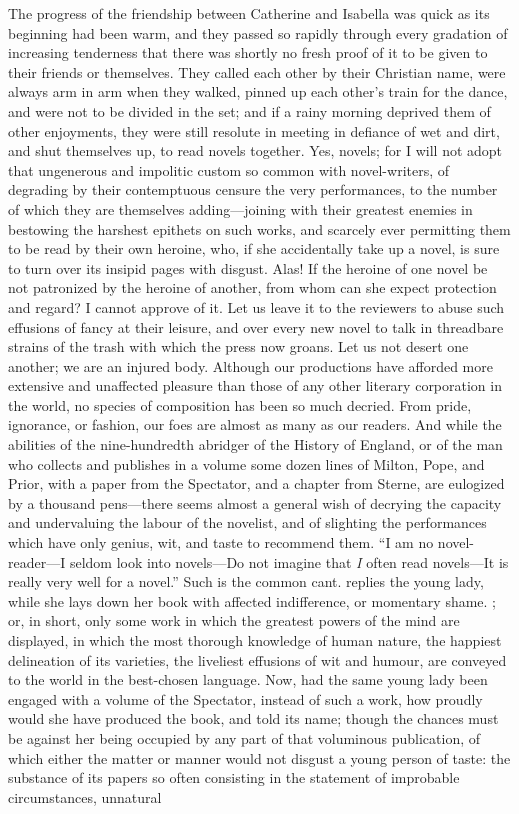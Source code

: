 The progress of the friendship between Catherine and Isabella was quick as its beginning had been warm, and they passed so rapidly through every gradation of increasing tenderness that there was shortly no fresh proof of it to be given to their friends or themselves. They called each other by their Christian name, were always arm in arm when they walked, pinned up each other's train for the dance, and were not to be divided in the set; and if a rainy morning deprived them of other enjoyments, they were still resolute in meeting in defiance of wet and dirt, and shut themselves up, to read novels together. Yes, novels; for I will not adopt that ungenerous and impolitic custom so common with novel-writers, of degrading by their contemptuous censure the very performances, to the number of which they are themselves adding---joining with their greatest enemies in bestowing the harshest epithets on such works, and scarcely ever permitting them to be read by their own heroine, who, if she accidentally take up a novel, is sure to turn over its insipid pages with disgust. Alas! If the heroine of one novel be not patronized by the heroine of another, from whom can she expect protection and regard? I cannot approve of it. Let us leave it to the reviewers to abuse such effusions of fancy at their leisure, and over every new novel to talk in threadbare strains of the trash with which the press now groans. Let us not desert one another; we are an injured body. Although our productions have afforded more extensive and unaffected pleasure than those of any other literary corporation in the world, no species of composition has been so much decried. From pride, ignorance, or fashion, our foes are almost as many as our readers. And while the abilities of the nine-hundredth abridger of the History of England, or of the man who collects and publishes in a volume some dozen lines of Milton, Pope, and Prior, with a paper from the Spectator, and a chapter from Sterne, are eulogized by a thousand pens---there seems almost a general wish of decrying the capacity and undervaluing the labour of the novelist, and of slighting the performances which have only genius, wit, and taste to recommend them. “I am no novel-reader---I seldom look into novels---Do not imagine that {\em I} often read novels---It is really very well for a novel.” Such is the common cant.   replies the young lady, while she lays down her book with affected indifference, or momentary shame. ; or, in short, only some work in which the greatest powers of the mind are displayed, in which the most thorough knowledge of human nature, the happiest delineation of its varieties, the liveliest effusions of wit and humour, are conveyed to the world in the best-chosen language. Now, had the same young lady been engaged with a volume of the Spectator, instead of such a work, how proudly would she have produced the book, and told its name; though the chances must be against her being occupied by any part of that voluminous publication, of which either the matter or manner would not disgust a young person of taste: the substance of its papers so often consisting in the statement of improbable circumstances, unnatural 